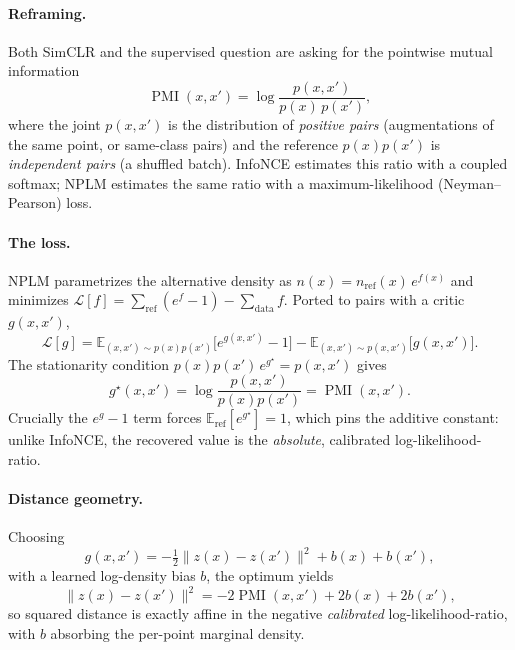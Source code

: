 \documentclass[11pt]{article}
\begin{document}
\paragraph{Reframing.} Both SimCLR and the supervised question are asking for the
pointwise mutual information
\begin{equation}
\operatorname{PMI}(x,x') = \log\frac{p(x,x')}{p(x)\,p(x')},
\end{equation}
where the joint $p(x,x')$ is the distribution of \emph{positive pairs}
(augmentations of the same point, or same-class pairs) and the reference
$p(x)p(x')$ is \emph{independent pairs} (a shuffled batch). InfoNCE estimates
this ratio with a coupled softmax; NPLM estimates the same ratio with a
maximum-likelihood (Neyman--Pearson) loss.

\paragraph{The loss.} NPLM parametrizes the alternative density as
$n(x)=n_{\mathrm{ref}}(x)\,e^{f(x)}$ and minimizes
$\mathcal{L}[f]=\sum_{\mathrm{ref}}(e^{f}-1)-\sum_{\mathrm{data}}f$. Ported to
pairs with a critic $g(x,x')$,
\begin{equation}
\mathcal{L}[g]
= \mathbb{E}_{(x,x')\sim p(x)p(x')}\!\big[e^{g(x,x')}-1\big]
- \mathbb{E}_{(x,x')\sim p(x,x')}\big[g(x,x')\big].
\label{eq:nplm}
\end{equation}
The stationarity condition $p(x)p(x')\,e^{g^\star}=p(x,x')$ gives
\begin{equation}
g^\star(x,x') = \log\frac{p(x,x')}{p(x)p(x')} = \operatorname{PMI}(x,x').
\end{equation}
Crucially the $e^{g}-1$ term forces $\mathbb{E}_{\mathrm{ref}}[e^{g^\star}]=1$,
which pins the additive constant: unlike InfoNCE, the recovered value is the
\emph{absolute}, calibrated log-likelihood-ratio.

\paragraph{Distance geometry.} Choosing
\begin{equation}
g(x,x') = -\tfrac12\|z(x)-z(x')\|^2 + b(x) + b(x'),
\end{equation}
with a learned log-density bias $b$, the optimum yields
\begin{equation}
\|z(x)-z(x')\|^2 = -2\operatorname{PMI}(x,x') + 2b(x) + 2b(x'),
\end{equation}
so squared distance is exactly affine in the negative \emph{calibrated}
log-likelihood-ratio, with $b$ absorbing the per-point marginal density.
\end{document}
